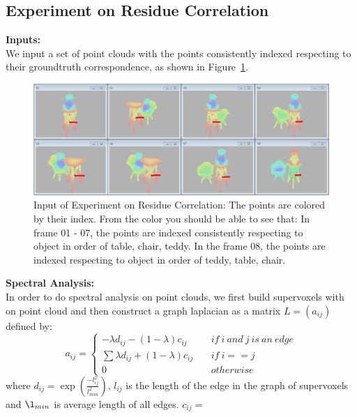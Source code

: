 \subsection{Experiment on Residue Correlation}
\label{subsec:exp:res}
\textbf{Inputs:}\\
We input a set of point clouds with the points consistently indexed respecting to their groundtruth correspondence, as shown in Figure~\ref{fig:input_for_exp_res}.\\
\begin{figure}
	\centering
	\includegraphics[width=\textwidth]{images/exp_res/inputs.png}
	\caption{Input of Experiment on Residue Correlation: The points are colored by their index. From the color you should be able to see that: In frame 01 - 07, the points are indexed consistently respecting to object in order of table, chair, teddy. In the frame 08, the points are indexed respecting to object in order of teddy, table, chair.}
	\label{fig:input_for_exp_res}
\end{figure}
\textbf{Spectral Analysis:}\\
In order to do spectral analysis on point clouds, we first build supervoxels with \cite{Supervoxels} on point cloud and then construct a graph laplacian as a matrix $L=(a_{ij})$ defined by:
$$ a_{ij}=\left\{
\begin{aligned}
-\lambda d_{ij}-(1-\lambda) c_{ij} &~&if~i~and~j~is~an~edge\\
\sum\lambda d_{ij}+(1-\lambda) c_{ij} &~&if~i==j\\
0 &~&otherwise
\end{aligned}
\right.
$$
where $d_{ij}=\exp(\frac{-l_{ij}^2}{l_{min}^2})$, $l_{ij}$ is the length of the edge in the graph of supervoxels and $\l_{min}$ is average length of all edges.  $c_{ij}=$
